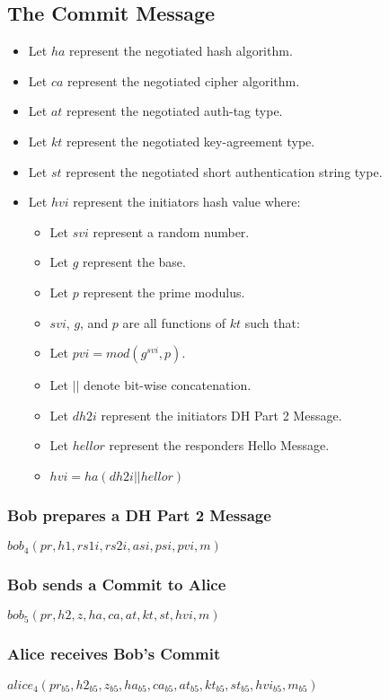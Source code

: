 \documentclass[11pt]{article}
\begin{document}
  \subsection{The Commit Message}
  \begin{itemize}
    \item Let $ha$ represent the negotiated hash algorithm.
    \item Let $ca$ represent the negotiated cipher algorithm.
    \item Let $at$ represent the negotiated auth-tag type.
    \item Let $kt$ represent the negotiated key-agreement type.
    \item Let $st$ represent the negotiated short authentication
            string type.
    \item Let $hvi$ represent the initiators hash value where:
      \begin{itemize}
        \item Let $svi$ represent a random number.
        \item Let $g$ represent the base.
        \item Let $p$ represent the prime modulus.
        \item $svi$, $g$, and $p$ are all functions of $kt$
              such that: 
        \item Let $pvi = mod(g^{svi},p)$.
        \item Let $||$ denote bit-wise concatenation.
        \item Let $dh2i$ represent the initiators DH Part 2 Message.
        \item Let $hellor$ represent the responders Hello Message.
        \item $hvi = ha(dh2i || hellor)$
      \end{itemize}
  \end{itemize}
  \subsubsection{Bob prepares a DH Part 2 Message}
  $bob_4(pr,h1,rs1i,rs2i,asi,psi,pvi,m)$
  \subsubsection{Bob sends a Commit to Alice}
  $bob_5(pr,h2,z,ha,ca,at,kt,st,hvi,m)$
  \subsubsection{Alice receives Bob's Commit}
  $alice_4(pr_{b5},h2_{b5},z_{b5},ha_{b5},ca_{b5},at_{b5},kt_{b5}
    ,st_{b5},hvi_{b5},m_{b5})$
\end{document}
